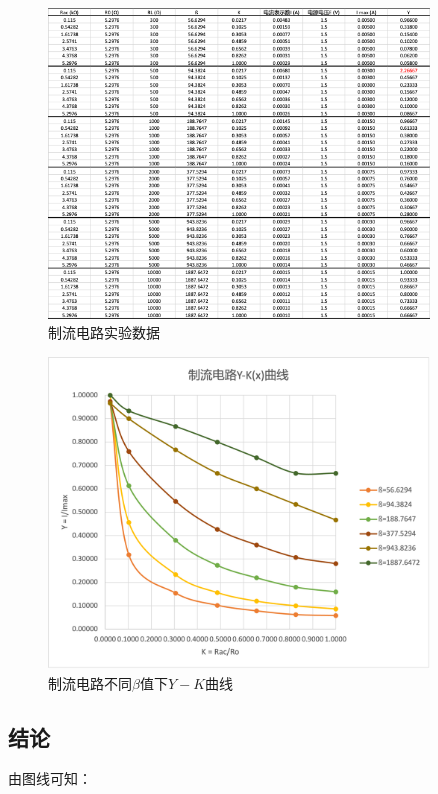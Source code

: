 \documentclass{article}
\begin{document}
\begin{figure}[htbp]
    \centering
    \includegraphics[width=0.9\textwidth]{current-control-data.png}
    \caption{制流电路实验数据}
\end{figure}

\begin{figure}[htbp]
    \centering
    \includegraphics[width=0.9\textwidth]{current-control-plot.png}
    \caption{制流电路不同$\beta$值下$Y-K$曲线}
\end{figure}

\newpage

\subsection{结论}
由图线可知：
\end{document}
